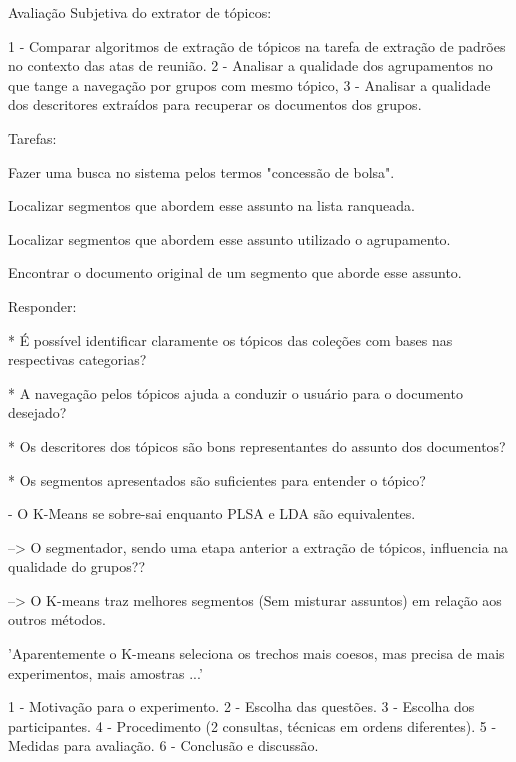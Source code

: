 




Avaliação Subjetiva do extrator de tópicos:

1 - Comparar algoritmos de extração de tópicos na tarefa de extração de padrões no contexto
das atas de reunião. 
2 - Analisar a qualidade dos agrupamentos no que tange a navegação por grupos com mesmo tópico, 
3 - Analisar a qualidade dos descritores extraídos para recuperar os documentos dos grupos.


Tarefas:

Fazer uma busca no sistema pelos termos "concessão de bolsa".

Localizar segmentos que abordem esse assunto na lista ranqueada.

Localizar segmentos que abordem esse assunto utilizado o agrupamento.

Encontrar o documento original de um segmento que aborde esse assunto.

Responder:


* É possível identificar claramente os tópicos das coleções com bases nas respectivas categorias?


* A navegação pelos tópicos ajuda a conduzir o usuário para o documento desejado?


* Os descritores dos tópicos são bons representantes do assunto dos documentos?


* Os segmentos apresentados são suficientes para entender o tópico?








 - O K-Means se sobre-sai enquanto PLSA e LDA são equivalentes.


--> O segmentador, sendo uma etapa anterior a extração de tópicos, influencia na qualidade do grupos??

--> O K-means traz melhores segmentos (Sem misturar assuntos) em relação aos outros métodos.


'Aparentemente o K-means seleciona os trechos mais coesos, mas precisa de mais experimentos, mais amostras ...'




 1 - Motivação para o experimento.
 2 - Escolha das questões.
 3 - Escolha dos participantes.
 4 - Procedimento (2 consultas, técnicas em ordens diferentes).
 5 - Medidas para avaliação.
 6 - Conclusão e discussão.


